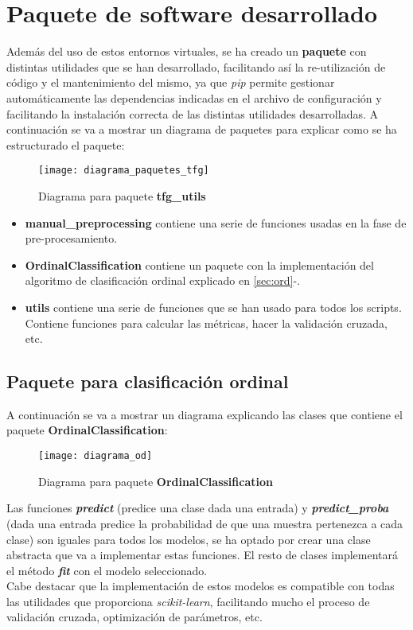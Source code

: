 \section{Paquete de software desarrollado}
Además del uso de estos entornos virtuales, se ha creado un \textbf{paquete} con distintas utilidades que se han desarrollado, facilitando así la re-utilización de código y el mantenimiento del mismo, ya que \textit{pip} permite gestionar automáticamente las dependencias indicadas en el archivo de configuración y facilitando la instalación correcta de las distintas utilidades desarrolladas.
A continuación se va a mostrar un diagrama de paquetes para explicar como se ha estructurado el paquete:
\begin{figure}[H]
    \centering
    \texttt{[image: diagrama\_paquetes\_tfg]}
    \caption{Diagrama para paquete \textbf{tfg\_utils}}
    \label{dig:paquetes_tfg}
\end{figure}
\begin{itemize}
    \item \textbf{manual\_preprocessing} contiene una serie de funciones usadas en la fase de pre-procesamiento.
    \item \textbf{OrdinalClassification} contiene un paquete con la implementación del algoritmo de clasificación ordinal explicado en \ref{sec:ord}-.
    \item \textbf{utils} contiene una serie de funciones que se han usado para todos los scripts. Contiene funciones para calcular las métricas, hacer la validación cruzada, etc.
\end{itemize}
\subsection{Paquete para clasificación ordinal}
 A continuación se va a mostrar un diagrama explicando las clases que contiene el paquete \textbf{OrdinalClassification}:
 \begin{figure}[H]
     \centering
     \texttt{[image: diagrama\_od]}
     \caption{Diagrama para paquete \textbf{OrdinalClassification}}
     \label{dig:paquetes_od}
 \end{figure}
Las funciones \textbf{\textit{predict}} (predice una clase dada una entrada) y \textbf{\textit{predict\_proba}} (dada una entrada predice la probabilidad de que una muestra pertenezca a cada clase)  son iguales para todos los modelos, se ha optado por crear una clase abstracta que va a implementar estas funciones. El resto de clases implementará el método \textbf{\textit{fit}} con el modelo seleccionado. \\
Cabe destacar que la implementación de estos modelos es compatible con todas las utilidades que proporciona \textit{scikit-learn}, facilitando mucho el proceso de validación cruzada, optimización de parámetros, etc.\\
